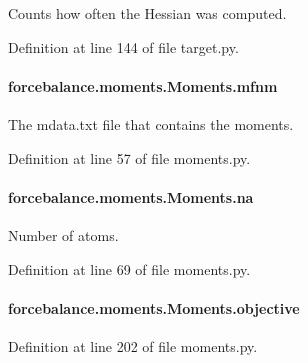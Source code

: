 Counts how often the Hessian was computed. 



Definition at line 144 of file target.\-py.

\hypertarget{classforcebalance_1_1moments_1_1Moments_ab9cf14ace681ac05db60b368b7726311}{
\paragraph[{mfnm}]{\setlength{\rightskip}{0pt plus 5cm}forcebalance.\-moments.\-Moments.\-mfnm}}\label{classforcebalance_1_1moments_1_1Moments_ab9cf14ace681ac05db60b368b7726311}


The mdata.\-txt file that contains the moments. 



Definition at line 57 of file moments.\-py.

\hypertarget{classforcebalance_1_1moments_1_1Moments_ab04edfe986c2fc46d11af156d76a7b2f}{
\paragraph[{na}]{\setlength{\rightskip}{0pt plus 5cm}forcebalance.\-moments.\-Moments.\-na}}\label{classforcebalance_1_1moments_1_1Moments_ab04edfe986c2fc46d11af156d76a7b2f}


Number of atoms. 



Definition at line 69 of file moments.\-py.

\hypertarget{classforcebalance_1_1moments_1_1Moments_aa90c357e8ee9f18bb9db99688bbeb227}{
\paragraph[{objective}]{\setlength{\rightskip}{0pt plus 5cm}forcebalance.\-moments.\-Moments.\-objective}}\label{classforcebalance_1_1moments_1_1Moments_aa90c357e8ee9f18bb9db99688bbeb227}


Definition at line 202 of file moments.\-py.

